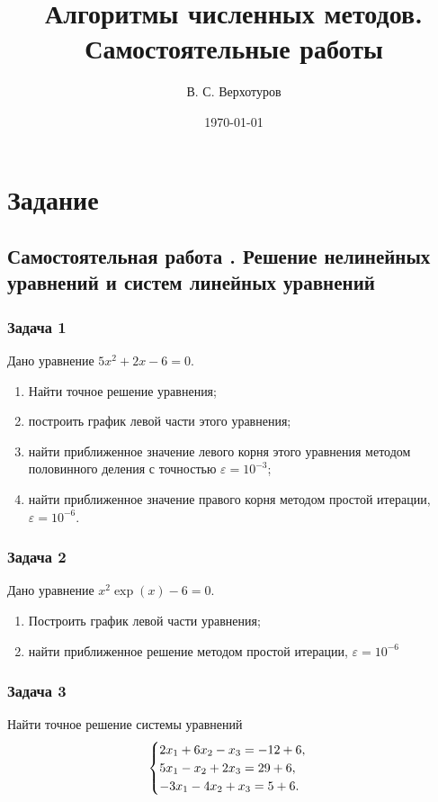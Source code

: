 \documentclass[10pt, a4paper, titlepage]{article}
\title{Алгоритмы численных методов. \\ Самостоятельные работы}
\author{В. С. Верхотуров}
\affil{БСБО-05-20}
\affil{РТУ МИРЭА}
\date\today
\begin{document}
\maketitle
\tableofcontents
\newpage

\section*{Задание}

\subsection*{Самостоятельная работа . Решение нелинейных уравнений и систем линейных уравнений}

\subsubsection*{Задача 1}
Дано уравнение $5x^2+2x-6=0$.
\begin{enumerate}
    \item Найти точное решение уравнения;
    \item построить график левой части этого уравнения;
    \item найти приближенное значение левого корня этого уравнения методом половинного деления с точностью $\varepsilon=10^{-3}$;
    \item найти приближенное значение правого корня методом простой итерации, $\varepsilon=10^{-6}$.
\end{enumerate}

\subsubsection*{Задача 2}
Дано уравнение $x^2\exp(x)-6=0$.
\begin{enumerate}
    \item Построить график левой части уравнения;
    \item найти приближенное решение методом простой итерации, $\varepsilon=10^{-6}$
\end{enumerate}

\subsubsection*{Задача 3}
Найти точное решение системы уравнений
\begin{equation*}
    \begin{cases}
        $$2x_1+6x_2-x_3 = -12+6$$, \\
        $$5x_1-x_2+2x_3 = 29+6$$, \\
        $$-3x_1-4x_2+x_3 = 5+6$$.
    \end{cases}
\end{equation*}
\end{document}
